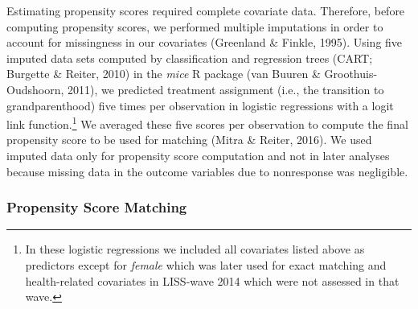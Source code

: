 \documentclass[
  english,
  man, noextraspace]{apa7}
\begin{document}
Estimating propensity scores required complete covariate data. Therefore, before computing propensity scores, we performed multiple imputations in order to account for missingness in our covariates (Greenland \& Finkle, 1995). Using five imputed data sets computed by classification and regression trees (CART; Burgette \& Reiter, 2010) in the \emph{mice} R package (van Buuren \& Groothuis-Oudshoorn, 2011), we predicted treatment assignment (i.e., the transition to grandparenthood) five times per observation in logistic regressions with a logit link function.\footnote{In these logistic regressions we included all covariates listed above as predictors except for \emph{female} which was later used for exact matching and health-related covariates in LISS-wave 2014 which were not assessed in that wave.} We averaged these five scores per observation to compute the final propensity score to be used for matching (Mitra \& Reiter, 2016). We used imputed data only for propensity score computation and not in later analyses because missing data in the outcome variables due to nonresponse was negligible.

\hypertarget{propensity-score-matching}{%
\subsubsection{Propensity Score Matching}\label{propensity-score-matching}}
\end{document}
